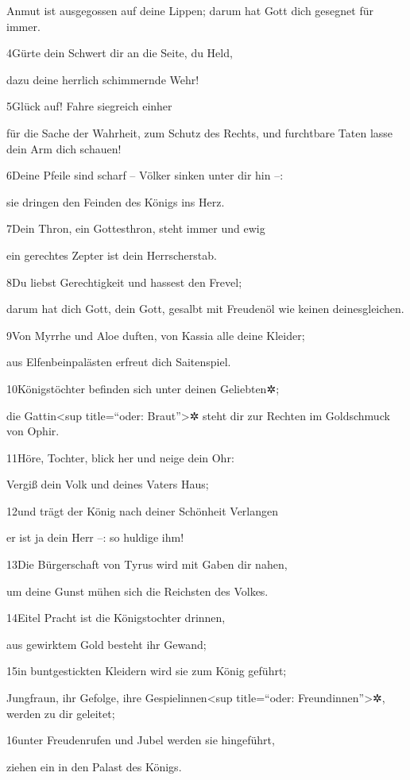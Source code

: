 Anmut ist ausgegossen auf deine Lippen; darum hat Gott dich gesegnet für
immer.

4Gürte dein Schwert dir an die Seite, du Held,

dazu deine herrlich schimmernde Wehr!

5Glück auf! Fahre siegreich einher

für die Sache der Wahrheit, zum Schutz des Rechts, und furchtbare Taten
lasse dein Arm dich schauen!

6Deine Pfeile sind scharf -- Völker sinken unter dir hin --:

sie dringen den Feinden des Königs ins Herz.

7Dein Thron, ein Gottesthron, steht immer und ewig

ein gerechtes Zepter ist dein Herrscherstab.

8Du liebst Gerechtigkeit und hassest den Frevel;

darum hat dich Gott, dein Gott, gesalbt mit Freudenöl wie keinen
deinesgleichen.

9Von Myrrhe und Aloe duften, von Kassia alle deine Kleider;

aus Elfenbeinpalästen erfreut dich Saitenspiel.

10Königstöchter befinden sich unter deinen Geliebten✲;

die Gattin\textless sup title=``oder: Braut''\textgreater✲ steht dir zur
Rechten im Goldschmuck von Ophir.

11Höre, Tochter, blick her und neige dein Ohr:

Vergiß dein Volk und deines Vaters Haus;

12und trägt der König nach deiner Schönheit Verlangen

er ist ja dein Herr --: so huldige ihm!

13Die Bürgerschaft von Tyrus wird mit Gaben dir nahen,

um deine Gunst mühen sich die Reichsten des Volkes.

14Eitel Pracht ist die Königstochter drinnen,

aus gewirktem Gold besteht ihr Gewand;

15in buntgestickten Kleidern wird sie zum König geführt;

Jungfraun, ihr Gefolge, ihre Gespielinnen\textless sup title=``oder:
Freundinnen''\textgreater✲, werden zu dir geleitet;

16unter Freudenrufen und Jubel werden sie hingeführt,

ziehen ein in den Palast des Königs.


